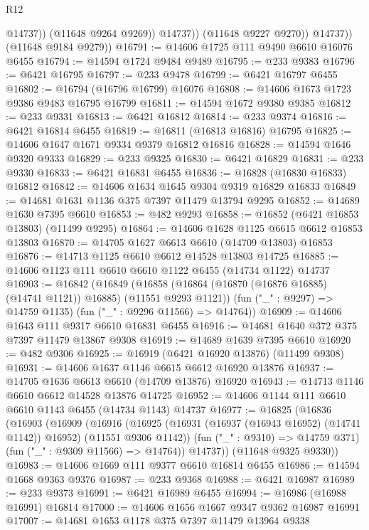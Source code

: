 \begin{lexlean}{R12}
\begin{coremodule}
                      @14737))
                  (@11648 @9264 @9269))
                @14737))
            (@11648 @9227 @9270))
          @14737))
      (@11648 @9184 @9279))
@16791 := @14606 @1725 @111 @9490 @6610 @16076 @6455
@16794 := @14594 @1724 @9484 @9489
@16795 := @233 @9383
@16796 := @6421 @16795
@16797 := @233 @9478
@16799 := @6421 @16797 @6455
@16802 := @16794 (@16796 @16799) @16076
@16808 := @14606 @1673 @1723 @9386 @9483 @16795 @16799
@16811 := @14594 @1672 @9380 @9385
@16812 := @233 @9331
@16813 := @6421 @16812
@16814 := @233 @9374
@16816 := @6421 @16814 @6455
@16819 := @16811 (@16813 @16816) @16795
@16825 := @14606 @1647 @1671 @9334 @9379 @16812 @16816
@16828 := @14594 @1646 @9320 @9333
@16829 := @233 @9325
@16830 := @6421 @16829
@16831 := @233 @9330
@16833 := @6421 @16831 @6455
@16836 := @16828 (@16830 @16833) @16812
@16842 := @14606 @1634 @1645 @9304 @9319 @16829 @16833
@16849 := @14681 @1631 @1136 @375 @7397 @11479 @13794 @9295
@16852 := @14689 @1630 @7395 @6610
@16853 := @482 @9293
@16858 := @16852 (@6421 @16853 @13803) (@11499 @9295)
@16864 := @14606 @1628 @1125 @6615 @6612 @16853 @13803
@16870 := @14705 @1627 @6613 @6610 (@14709 @13803) @16853
@16876 := @14713 @1125 @6610 @6612 @14528 @13803 @14725
@16885 := @14606 @1123 @111 @6610 @6610 @1122 @6455 (@14734 @1122) @14737
@16903 := @16842
    (@16849
      (@16858 (@16864 (@16870 (@16876 @16885) (@14741 @1121)) @16885) (@11551 @9293 @1121))
      (fun ("_" : @9297) => @14759 @1135)
      (fun ("_" : @9296 @11566) => @14764))
@16909 := @14606 @1643 @111 @9317 @6610 @16831 @6455
@16916 := @14681 @1640 @372 @375 @7397 @11479 @13867 @9308
@16919 := @14689 @1639 @7395 @6610
@16920 := @482 @9306
@16925 := @16919 (@6421 @16920 @13876) (@11499 @9308)
@16931 := @14606 @1637 @1146 @6615 @6612 @16920 @13876
@16937 := @14705 @1636 @6613 @6610 (@14709 @13876) @16920
@16943 := @14713 @1146 @6610 @6612 @14528 @13876 @14725
@16952 := @14606 @1144 @111 @6610 @6610 @1143 @6455 (@14734 @1143) @14737
@16977 := @16825
    (@16836
      (@16903
        (@16909
          (@16916
            (@16925 (@16931 (@16937 (@16943 @16952) (@14741 @1142)) @16952) (@11551 @9306 @1142))
            (fun ("_" : @9310) => @14759 @371)
            (fun ("_" : @9309 @11566) => @14764))
          @14737))
      (@11648 @9325 @9330))
@16983 := @14606 @1669 @111 @9377 @6610 @16814 @6455
@16986 := @14594 @1668 @9363 @9376
@16987 := @233 @9368
@16988 := @6421 @16987
@16989 := @233 @9373
@16991 := @6421 @16989 @6455
@16994 := @16986 (@16988 @16991) @16814
@17000 := @14606 @1656 @1667 @9347 @9362 @16987 @16991
@17007 := @14681 @1653 @1178 @375 @7397 @11479 @13964 @9338

\end{coremodule}
\end{lexlean}
